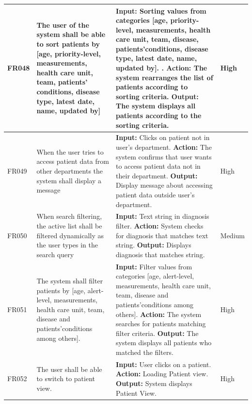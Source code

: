 \documentclass{scrreprt}
\begin{document}
\begin{center}
\begin{tabularx}{\linewidth}{| l | X | X | l |}
\hline
FR048 & The user of the system shall be able to sort patients by [age, priority-level, measurements, health care unit, team, patients’ conditions, disease type, latest date, name, updated by] & \textbf{Input:} Sorting values from categories [age, priority-level, measurements, health care unit, team, disease, patients’conditions, disease type, latest date, name, updated by]. .
\newline \textbf{Action:} The system rearranges the list of patients according to sorting criteria.
\newline \textbf{Output:} The system displays all patients according to the sorting criteria. & High \\ 
\hline
FR049 & When the user tries to access patient data from other departments the system shall display a message & \textbf{Input:} Clicks on patient not in user's department.
\newline \textbf{Action:} The system confirms that user wants to access patient data not in their department.
\newline \textbf{Output:} Display message about accessing patient data outside user's department. & High \\ 
\hline
FR050 & When search filtering, the active list shall be filtered dynamically as the user types in the search query     & \textbf{Input:} Text string in diagnosis filter.
\newline \textbf{Action:} System checks for diagnosis that matches text string.
\newline \textbf{Output:} Displays diagnosis that matches string. & Medium \\ 
\hline
FR051 & The system shall filter patients by [age, alert-level, measurements, health care unit, team, disease and patients’conditions among others].  & \textbf{Input:} Filter values from categories [age, alert-level, measurements, health care unit, team, disease and patients’conditions among others].
\newline \textbf{Action:} The system searches for patients matching filter criteria.
\newline \textbf{Output:} The system displays all patients who matched the filters. & High \\ 
\hline
FR052 & The user shall be able to switch to patient view. & \textbf{Input:} User clicks on a patient.
\newline \textbf{Action:} Loading Patient view.
\newline \textbf{Output:} System displays Patient View. & High \\ 
\hline
\end{tabularx}
\end{center}
\end{document}
